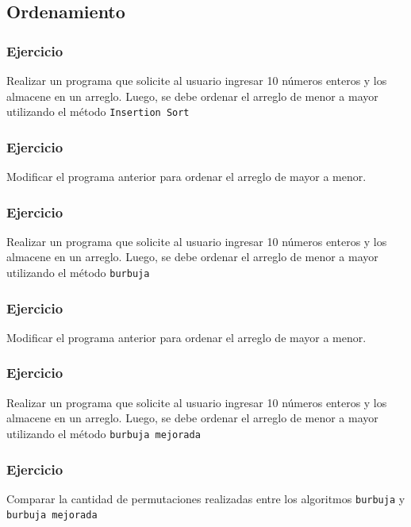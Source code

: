 \subsection*{Ordenamiento}
\subsubsection{Ejercicio}
Realizar un programa que solicite al usuario ingresar 10 números enteros y los almacene en un arreglo. Luego, se debe ordenar el arreglo de menor a mayor utilizando el método \texttt{Insertion Sort}

\subsubsection{Ejercicio}
Modificar el programa anterior para ordenar el arreglo de mayor a menor.

\subsubsection{Ejercicio}
Realizar un programa que solicite al usuario ingresar 10 números enteros y los almacene en un arreglo. Luego, se debe ordenar el arreglo de menor a mayor utilizando el método \texttt{burbuja}

\subsubsection{Ejercicio}
Modificar el programa anterior para ordenar el arreglo de mayor a menor.

\subsubsection{Ejercicio}
Realizar un programa que solicite al usuario ingresar 10 números enteros y los almacene en un arreglo. Luego, se debe ordenar el arreglo de menor a mayor utilizando el método \texttt{burbuja mejorada}

\subsubsection{Ejercicio}
Comparar la cantidad de permutaciones realizadas entre los algoritmos \texttt{burbuja} y \texttt{burbuja mejorada}

